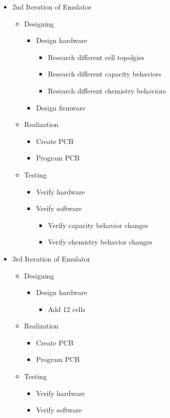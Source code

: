 \begin{itemize}
    \item 2nd Iteration of Emulator
    \begin{itemize}
        \item Designing 
        \begin{itemize}
            \item Design hardware
            \begin{itemize}
                \item Research different cell topolgies 
                \item Research different capacity behaviors 
                \item Research different chemistry behaviors
            \end{itemize}
            \item Design firmware
        \end{itemize}
        \item Realization
        \begin{itemize}
        \item Create PCB
        \item Program PCB
        \end{itemize}
        \item Testing
        \begin{itemize}
            \item Verify hardware
            \item Verify software 
            \begin{itemize}
                \item Verify capacity behavior changes
                \item Verify chemistry behavior changes
            \end{itemize}
        \end{itemize}
    \end{itemize}

    \item 3rd Iteration of Emulator 
    \begin{itemize}
        \item Designing 
        \begin{itemize}
            \item Design hardware
            \begin{itemize}
                \item Add 12 cells
            \end{itemize}
        \end{itemize}
        \item Realization
        \begin{itemize}
        \item Create PCB
        \item Program PCB
        \end{itemize}
        \item Testing
        \begin{itemize}
            \item Verify hardware
            \item Verify software 
        \end{itemize}
    \end{itemize}



\end{itemize}
